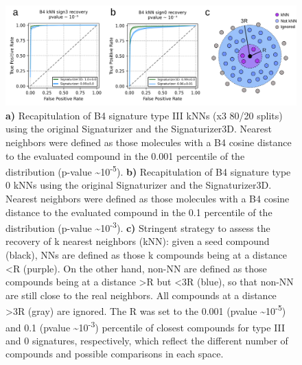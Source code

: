 \begin{figure}[htbp]
  \centering
  \includegraphics[width=1\linewidth]{figures/Stereoisomers/Supplementary/FigS2.png}
  \caption{
    \textbf{a)} Recapitulation of B4 signature type III kNNs (x3 80/20 splits) using the original Signaturizer and the Signaturizer3D. Nearest neighbors were defined as those molecules with a B4 cosine distance to the evaluated compound in the 0.001 percentile of the distribution (p-value \textasciitilde10\textsuperscript{-5}).
    \textbf{b)} Recapitulation of B4 signature type 0 kNNs using the original Signaturizer and the Signaturizer3D. Nearest neighbors were defined as those molecules with a B4 cosine distance to the evaluated compound in the 0.1 percentile of the distribution (p-value \textasciitilde10\textsuperscript{-3}).
    \textbf{c)} Stringent strategy to assess the recovery of k nearest neighbors (kNN): given a seed compound (black), NNs are defined as those k compounds being at a distance <R (purple). On the other hand, non-NN are defined as those compounds being at a distance >R but <3R (blue), so that non-NN are still close to the real neighbors. All compounds at a distance >3R (gray) are ignored. The R was set to the 0.001 (pvalue \textasciitilde10\textsuperscript{-5}) and 0.1 (pvalue \textasciitilde10\textsuperscript{-3}) percentile of closest compounds for type III and 0 signatures, respectively, which reflect the different number of compounds and possible comparisons in each space.
  }
  \label{Stereoisomers_FigS2}
\end{figure}